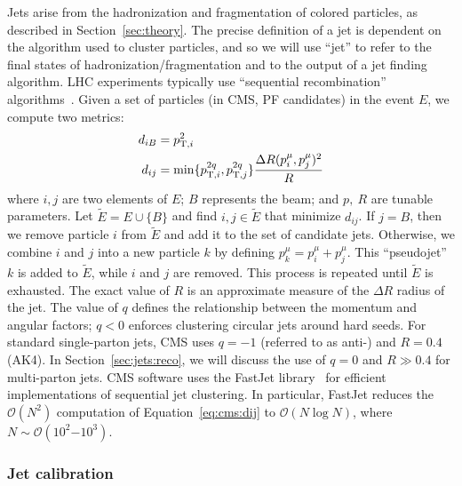 Jets arise from the hadronization and fragmentation of colored particles, as described in Section~\ref{sec:theory}.
The precise definition of a jet is dependent on the algorithm used to cluster particles, and so we will use ``jet'' to refer to the final states of hadronization/fragmentation and to the output of a jet finding algorithm.
LHC experiments typically use ``sequential recombination'' algorithms~\cite{antikt,kt,ca}.
Given a set of particles (in CMS, PF candidates) in the event $E$, we compute two metrics:
\begin{align}
	d_{iB} &= p_{\mathrm{T},i}^2 \nonumber \\ 
	d_{ij} &= \min\{p_{\mathrm{T},i}^{2q}, p_{\mathrm{T},j}^{2q}\} \frac{\Delta R(p_i^\mu, p_j^\mu)^2}{R}
	\label{eq:cms:dij}
\end{align}
where $i,j$ are two elements of $E$; $B$ represents the beam; and $p,~R$ are tunable parameters.
Let $\tilde E = E \cup \{B\}$ and find $i,j\in \tilde E$ that minimize $d_{ij}$.
If $j=B$, then we remove particle $i$ from $\tilde E$ and add it to the set of candidate jets.
Otherwise, we combine $i$ and $j$ into a new particle $k$ by defining $p_k^\mu = p_i^\mu + p_j^\mu$.
This ``pseudojet'' $k$ is added to $\tilde E$, while $i$ and $j$ are removed.
This process is repeated until $\tilde E$ is exhausted.
The exact value of $R$ is an approximate measure of the $\Delta R$ radius of the jet. 
The value of $q$ defines the relationship between the momentum and angular factors; $q<0$  enforces clustering circular jets around hard seeds.
For standard single-parton jets, CMS uses $q=-1$ (referred to as anti-\kt) and $R=0.4$ (AK4).
In Section~\ref{sec:jets:reco}, we will discuss the use of $q=0$ and $R\gg 0.4$ for multi-parton jets. 
CMS software uses the FastJet library~\cite{fastjet} for efficient implementations of sequential jet clustering.
In particular, FastJet reduces the $\mathcal{O}(N^2)$ computation of Equation~\ref{eq:cms:dij} to $\mathcal{O}(N\log N)$, where $N\sim\mathcal{O}(10^{2}\mathrm{-}10^3)$. 

\subsubsection{Jet calibration}

